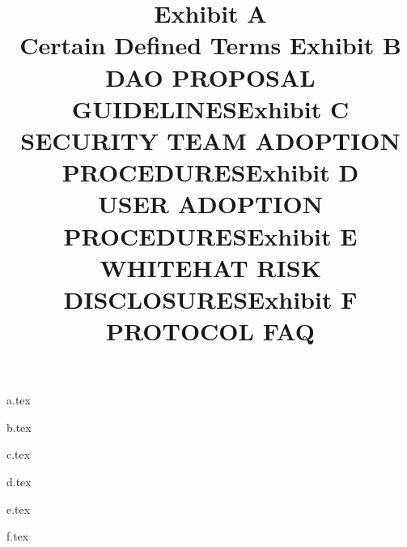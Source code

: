 \documentclass{article}
\begin{document}
\newpage
\title{Exhibit A\\
    Certain Defined Terms
}
\maketitle

{a.tex}

\newpage
\title{Exhibit B \\
    DAO PROPOSAL GUIDELINES}
\maketitle

{b.tex}

\newpage
\title{Exhibit C \\
    SECURITY TEAM ADOPTION PROCEDURES}
\maketitle

{c.tex}

\newpage
\title{Exhibit D\\
    USER ADOPTION PROCEDURES}
\maketitle

{d.tex}

\newpage
\title{Exhibit E\\
    WHITEHAT RISK DISCLOSURES}\label{exhibit:e}
\maketitle

{e.tex}

\newpage
\title{Exhibit F\\
    PROTOCOL FAQ}
\maketitle

{f.tex}
\end{document}
